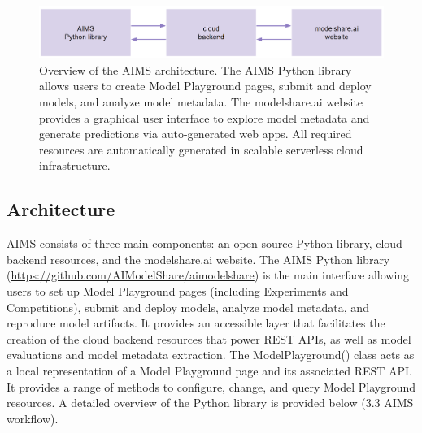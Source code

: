 \begin{figure}
  \centering
  \includegraphics[width=1\textwidth]{figures/fig_aims_architecture.png}
  \caption{Overview of the AIMS architecture. The AIMS Python library allows users to create Model Playground pages, submit and deploy models, and analyze model metadata. The modelshare.ai website provides a graphical user interface to explore model metadata and generate predictions via auto-generated web apps. All required resources are automatically generated in scalable serverless cloud infrastructure.}
  \label{fig:fig_architecture}
\end{figure}

\subsection{Architecture}
AIMS consists of three main components: an open-source Python library, cloud backend resources, and the modelshare.ai website. The AIMS Python library (\href{https://github.com/AIModelShare/aimodelshare}{https://github.com/AIModelShare/aimodelshare}) is the main interface allowing users to set up Model Playground pages (including Experiments and Competitions), submit and deploy models, analyze model metadata, and reproduce model artifacts. It provides an accessible layer that facilitates the creation of the cloud backend resources that power REST APIs, as well as model evaluations and model metadata extraction. The ModelPlayground() class acts as a local representation of a Model Playground page and its associated REST API. It provides a range of methods to configure, change, and query Model Playground resources. A detailed overview of the Python library is provided below (3.3 AIMS workflow). 

